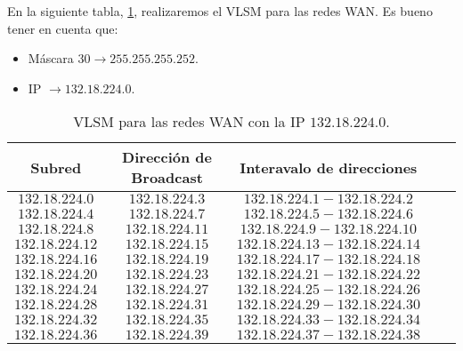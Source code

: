 En la siguiente tabla, \cref{table: VLSM WAN}, realizaremos el VLSM para las
redes WAN. Es bueno tener en cuenta que:

\begin{itemize}
    \item Máscara \(30 \rightarrow 255.255.255.252 \).
    \item IP \(\rightarrow 132.18.224.0 \).
\end{itemize}

\begin{table}[ht]
    \centering
    \caption{VLSM para las redes WAN con la IP \(132.18.224.0\).}
    \begin{tabular}[t]{ccccc}
        \toprule
        \color{EAFIT-blue}\textbf{Subred} & \color{EAFIT-blue}\textbf{Dirección de Broadcast} & \color{EAFIT-blue}\textbf{Interavalo de direcciones} \\
        \midrule
        \(132.18.224.0\)                  & \(132.18.224.3\)                                  & \(132.18.224.1 - 132.18.224.2\)                      \\
        \(132.18.224.4\)                  & \(132.18.224.7\)                                  & \(132.18.224.5 - 132.18.224.6\)                      \\
        \(132.18.224.8\)                  & \(132.18.224.11\)                                 & \(132.18.224.9 - 132.18.224.10\)                     \\
        \(132.18.224.12\)                 & \(132.18.224.15\)                                 & \(132.18.224.13 - 132.18.224.14\)                    \\
        \(132.18.224.16\)                 & \(132.18.224.19\)                                 & \(132.18.224.17 - 132.18.224.18\)                    \\
        \(132.18.224.20\)                 & \(132.18.224.23\)                                 & \(132.18.224.21 - 132.18.224.22\)                    \\
        \(132.18.224.24\)                 & \(132.18.224.27\)                                 & \(132.18.224.25 - 132.18.224.26\)                    \\
        \(132.18.224.28\)                 & \(132.18.224.31\)                                 & \(132.18.224.29 - 132.18.224.30\)                    \\
        \(132.18.224.32\)                 & \(132.18.224.35\)                                 & \(132.18.224.33 - 132.18.224.34\)                    \\
        \(132.18.224.36\)                 & \(132.18.224.39\)                                 & \(132.18.224.37 - 132.18.224.38\)                    \\
        \bottomrule
    \end{tabular}
    \label{table: VLSM WAN}
\end{table}

